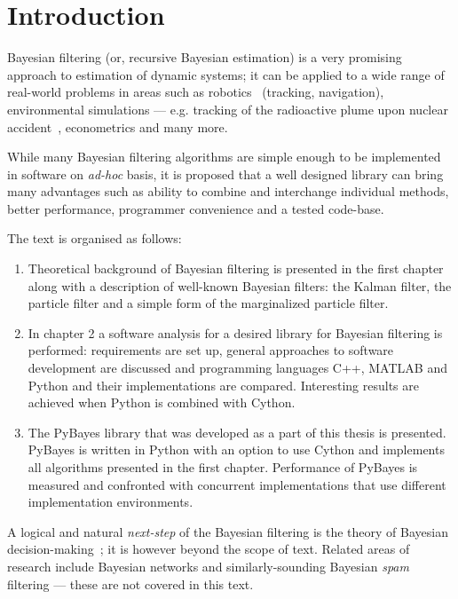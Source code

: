 \clearpage %
\chapter*{Introduction}

Bayesian filtering (or, recursive Bayesian estimation) is a very promising approach to estimation
of dynamic systems; it can be applied to a wide range of real-world problems in areas such as
robotics~\cite{ThrBurFox:05,Gus:02} (tracking, navigation), environmental simulations ---
e.g. tracking of the radioactive plume upon nuclear
accident~\cite{HofSmi:09,HofSmiPech:09,PechHofSmi:09}, econometrics and many more.

While many Bayesian filtering algorithms are simple enough to be implemented in software on
\emph{ad-hoc} basis, it is proposed that a well designed library can bring many advantages such as
ability to combine and interchange individual methods, better performance, programmer convenience
and a tested code-base.

\noindent{}The text is organised as follows:
\begin{enumerate}
	\item Theoretical background of Bayesian filtering is presented in the first chapter along with
	a description of well-known Bayesian filters: the Kalman filter, the particle filter and a
	simple form of the marginalized particle filter.
	\item In chapter 2 a software analysis for a desired library for Bayesian filtering is
	performed: requirements are set up, general approaches to software development are discussed and
	programming languages C++, MATLAB and Python and their implementations are compared. Interesting
	results are achieved when Python is combined with Cython.
	\item The PyBayes library that was developed as a part of this thesis is presented. PyBayes is
	written in Python with an option to use Cython and implements all algorithms presented in the
	first chapter. Performance of PyBayes is measured and confronted with concurrent implementations
	that use different implementation environments.
\end{enumerate}
A logical and natural \emph{next-step} of the Bayesian filtering is the theory of Bayesian
decision-making~\cite{Smi:05}; it is however beyond the scope of text. Related areas of research
include Bayesian networks and similarly-sounding Bayesian \emph{spam} filtering --- these are not
covered in this text.
